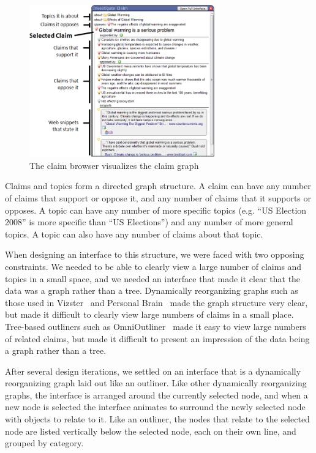 \documentclass{chi2009}
\begin{document}
\begin{figure}[tb]
	\begin{center}
	\includegraphics[width=8cm]{../screenshots/claimbrowse_diagram.png}
	\caption{The claim browser visualizes the claim graph}
	\label{claimbrowse_diagram}
	\end{center}
\end{figure}


Claims and topics form a directed graph structure. A claim can have any number of claims that support or oppose it, and any number of claims that it supports or opposes.
A topic can have any number of more specific topics (e.g. ``US Election 2008'' is more specific than ``US Elections'') and any number of more general topics. A topic can also have any number of claims about that topic.

When designing an interface to this structure, we were faced with two opposing constraints. We needed to be able to clearly view a large number of claims and topics in a small space, and we needed an interface that made it clear that the data was a graph rather than a tree. Dynamically reorganizing graphs such as those used in Vizster~\cite{vizster} and Personal Brain~\cite{thebrain} made the graph structure very clear, but made it difficult to clearly view large numbers of claims in a small place. Tree-based outliners such as OmniOutliner~\cite{omnioutliner} made it easy to view large numbers of related claims, but made it difficult to present an impression of the data being a graph rather than a tree.

After several design iterations, we settled on an interface that is a dynamically reorganizing graph laid out like an outliner. Like other dynamically reorganizing graphs, the interface is arranged around the currently selected node, and when a new node is selected the interface animates to surround the newly selected node with objects to relate to it. Like an outliner, the nodes that relate to the selected node are listed vertically below the selected node, each on their own line, and grouped by category.
\end{document}
